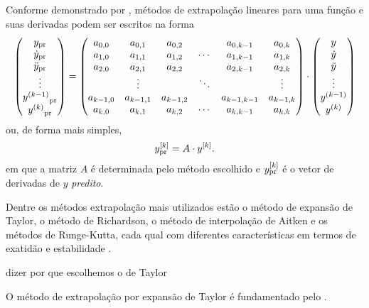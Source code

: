 Conforme demonstrado por , métodos de extrapolação lineares para uma função e suas derivadas podem ser escritos na forma
\[
\begin{pmatrix}
	\predicted{y} \\
	\predicted{\deriv{1}{y}} \\
	\predicted{\deriv{2}{y}} \\
	\vdots \\
	\predicted{\deriv{k-1}{y}} \\
	\predicted{\deriv{k}{y}}
\end{pmatrix}
=
\begin{pmatrix}
	a_{0,0} & a_{0,1} & a_{0,2} &  & a_{0,k-1} & a_{0,k} \\
	a_{1,0} & a_{1,1} & a_{1,2} & \cdots & a_{1,k-1} & a_{1,k} \\
	a_{2,0} & a_{2,1} & a_{2,2} &  & a_{2,k-1} & a_{2,k} \\
     & \vdots & & \ddots & & \vdots \\
    a_{k-1,0} & a_{k-1,1} & a_{k-1,2} &  & a_{k-1,k-1} & a_{k-1,k} \\
    a_{k,0} & a_{k,1} & a_{k,2} & \cdots & a_{k,k-1} & a_{k,k}
\end{pmatrix}
\cdot
\begin{pmatrix}
	y \\
	\deriv{1}{y} \\
	\deriv{2}{y} \\
	\vdots \\
	\deriv{k-1}{y} \\
	\deriv{k}{y}
\end{pmatrix}
\]
ou, de forma mais simples,
\begin{equation}
	\drvec{k}{\predicted{y}} = A \cdot \drvec{k}{y}.
\end{equation}
em que a matriz \(A\) é determinada pelo método escolhido e \(\drvec{k}{\predicted{y}}\) é o vetor de derivadas de \(y\) \textit{predito}.

Dentre os métodos extrapolação mais utilizados estão o método de expansão de Taylor, o método de Richardson, o método de interpolação de Aitken e os métodos de Runge-Kutta, cada qual com diferentes características em termos de exatidão e estabilidade .

\alert{dizer por que escolhemos o de Taylor}

O método de extrapolação por expansão de Taylor é fundamentado pelo .

